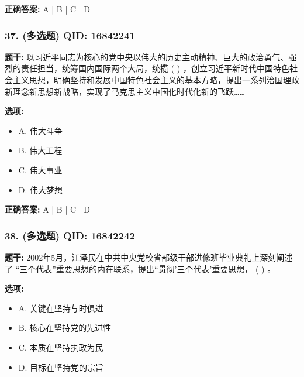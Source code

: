 \documentclass[12pt,UTF8]{ctexart}
\begin{document}
\textbf{正确答案:}
A | B | C | D

\vspace{0.3em}\hrulefill\vspace{0.7em}

\subsubsection*{37. (多选题) \small QID: 16842241}

\textbf{题干:}
以习近平同志为核心的党中央以伟大的历史主动精神、巨大的政治勇气、强烈的责任担当，统筹国内国际两个大局，统揽 ( ) ，创立习近平新时代中国特色社会主义思想，明确坚持和发展中国特色社会主义的基本方略，提出一系列治国理政新理念新思想新战略，实现了马克思主义中国化时代化新的飞跃……

\textbf{选项:}
\begin{itemize}[leftmargin=*]

  \item A. 伟大斗争

  \item B. 伟大工程

  \item C. 伟大事业

  \item D. 伟大梦想

\end{itemize}

\textbf{正确答案:}
A | B | C | D

\vspace{0.3em}\hrulefill\vspace{0.7em}

\subsubsection*{38. (多选题) \small QID: 16842242}

\textbf{题干:}
2002年5月，江泽民在中共中央党校省部级干部进修班毕业典礼上深刻阐述了 “三个代表”重要思想的内在联系，提出“贯彻’三个代表’重要思想， ( ) 。

\textbf{选项:}
\begin{itemize}[leftmargin=*]

  \item A. 关键在坚持与时俱进

  \item B. 核心在坚持党的先进性

  \item C. 本质在坚持执政为民

  \item D. 目标在坚持党的宗旨

\end{itemize}
\end{document}
